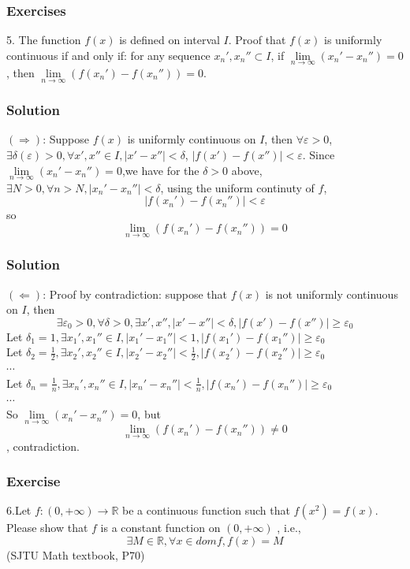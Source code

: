 \documentclass{beamer}
\begin{document}
    \begin{frame}
        \frametitle{Exercises}
        5. The function $f(x)$ is defined on interval $I$. Proof that $f(x)$ is uniformly continuous
        if and only if: for any sequence ${x_n'},{x_n''}\subset I$, if $\underset{n \to \infty}{\lim}(x_n'-x_n'')=0$,
        then $\underset{n \to \infty}{\lim}(f(x_n')-f(x_n''))=0$.
    \end{frame}
    \begin{frame}
        \frametitle{Solution}
    $(\Rightarrow)$: Suppose $f(x)$ is uniformly continuous on $I$, then 
    $\forall \varepsilon >0$,
    $\exists \delta(\varepsilon)>0, \forall x',x'' \in I, |x'-x''|<\delta$, $|f(x')-f(x'')|<\varepsilon$.
    Since $\underset{n\to \infty}{\lim}(x_n'-x_n'')=0$,we have
    for the $\delta>0$ above, $\exists N>0,\forall n>N, |x_n'-x_n''|<\delta$, using the uniform continuty of $f$,
    $$|f(x_n')-f(x_n'')|<\varepsilon$$
    so $$\underset{n\to \infty}{\lim}(f(x_n')-f(x_n''))=0$$
   
    \end{frame}
    \begin{frame}
        \frametitle{Solution}
    $(\Leftarrow)$: Proof by contradiction: suppose that $f(x)$ is not uniformly continuous on $I$, then
    $$\exists \varepsilon_0 >0,\forall \delta>0,\exists x',x'',|x'-x''|<\delta,|f(x')-f(x'')|\geq \varepsilon_0$$
    \vspace{1em}
        Let $\delta_1 =1, \exists x_1',x_1'' \in I,|x_1'-x_1''|<1,|f(x_1')-f(x_1'')|\geq \varepsilon_0$\\
        Let $\delta_2 =\frac{1}{2}, \exists x_2',x_2'' \in I,|x_2'-x_2''|<\frac{1}{2},|f(x_2')-f(x_2'')|\geq \varepsilon_0$\\
        $\cdots$\\
        Let $\delta_n =\frac{1}{n}, \exists x_n',x_n'' \in I,|x_n'-x_n''|<\frac{1}{n},|f(x_n')-f(x_n'')|\geq \varepsilon_0$\\
        $\cdots$\\
        So $\underset{n\to \infty}{\lim}(x_n'-x_n'')=0$, but $$\underset{n\to \infty}{\lim}(f(x_n')-f(x_n''))\neq 0$$, contradiction.
    \end{frame}
    \begin{frame}
        \frametitle{Exercise}
        6.Let $f:(0,+\infty)\to\mathbb{R}$ be a continuous function such that 
        $f(x^2)=f(x)$. Please show that $f$ is a constant function on $(0,+\infty)$
        , i.e., $$\exists M \in \mathbb{R},  \forall x \in dom f, f(x)=M$$
        (SJTU Math textbook, P70)
    \end{frame}
\end{document}

